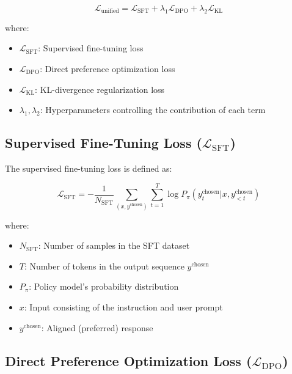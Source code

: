 \begin{equation}
\mathcal{L}_{\text{unified}} = \mathcal{L}_{\text{SFT}} + \lambda_1 \mathcal{L}_{\text{DPO}} + \lambda_2 \mathcal{L}_{\text{KL}}
\label{eq:unified_full}
\end{equation}

where:
\begin{itemize}[leftmargin=*,itemsep=1pt]
    \item $\mathcal{L}_{\text{SFT}}$: Supervised fine-tuning loss
    \item $\mathcal{L}_{\text{DPO}}$: Direct preference optimization loss
    \item $\mathcal{L}_{\text{KL}}$: KL-divergence regularization loss
    \item $\lambda_1, \lambda_2$: Hyperparameters controlling the contribution of each term
\end{itemize}

\subsection{Supervised Fine-Tuning Loss ($\mathcal{L}_{\text{SFT}}$)}

The supervised fine-tuning loss is defined as:

\begin{equation}
\mathcal{L}_{\text{SFT}} = -\frac{1}{N_{\text{SFT}}} \sum_{(x, y^{\text{chosen}})} \sum_{t=1}^{T} \log P_\pi(y_t^{\text{chosen}} | x, y_{<t}^{\text{chosen}})
\label{eq:sft_full}
\end{equation}

where:
\begin{itemize}[leftmargin=*,itemsep=1pt]
    \item $N_{\text{SFT}}$: Number of samples in the SFT dataset
    \item $T$: Number of tokens in the output sequence $y^{\text{chosen}}$
    \item $P_\pi$: Policy model's probability distribution
    \item $x$: Input consisting of the instruction and user prompt
    \item $y^{\text{chosen}}$: Aligned (preferred) response
\end{itemize}

\subsection{Direct Preference Optimization Loss ($\mathcal{L}_{\text{DPO}}$)}

